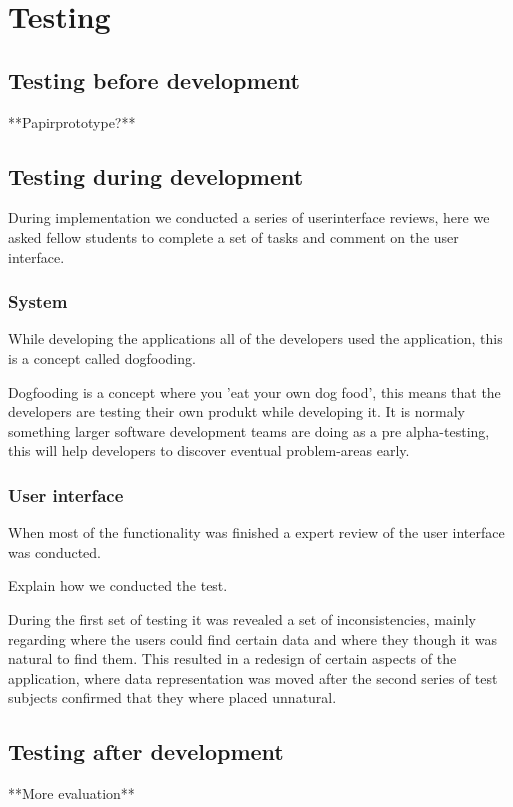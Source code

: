 \chapter{Testing}
\section{Testing before development}
**Papirprototype?**

\section{Testing during development}
During implementation we conducted a series of userinterface reviews, here we asked fellow students to complete a set of tasks and comment on the user interface. 

\subsection{System}
While developing the applications all of the developers used the application, this is a concept called dogfooding.

Dogfooding is a concept where you 'eat your own dog food', this means that the developers are testing their own produkt while developing it. It is normaly something larger software development teams are doing as a pre alpha-testing, this will help developers to discover eventual problem-areas early.

\subsection{User interface}
When most of the functionality was finished a expert review of the user interface was conducted.

Explain how we conducted the test.

During the first set of testing it was revealed a set of inconsistencies, mainly regarding where the users could find certain data and where they though it was natural to find them. 
This resulted in a redesign of certain aspects of the application, where data representation was moved after the second series of test subjects confirmed that they where placed unnatural.

\section{Testing after development}
**More evaluation**